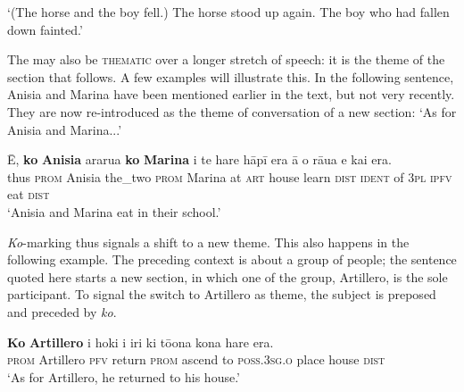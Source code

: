 \glt 
‘(The horse and the boy fell.) The horse stood up again. The boy who had fallen down fainted.’ \textstyleExampleref{[R399.025–026]}
\z

The  may also be \textsc{thematic} over a longer stretch of speech: it is the theme of the section that follows. A few examples will illustrate this. In the following sentence, Anisia and Marina have been mentioned earlier in the text, but not very recently. They are now re-introduced as the theme of conversation of a new section: ‘As for Anisia and Marina...’

\ea\label{ex:8.83}
\gll {\ꞌ}Ē, \textbf{ko} \textbf{Anisia} ararua \textbf{ko} \textbf{Marina} {\ꞌ}i te hare hāpī era {\ꞌ}ā o rāua  e kai era.\\
thus \textsc{prom} Anisia the\_two \textsc{prom} Marina at \textsc{art} house learn \textsc{dist} \textsc{ident} of \textsc{3pl}  \textsc{ipfv} eat \textsc{dist}\\

\glt
‘Anisia and Marina eat in their school.’ \textstyleExampleref{[R103.191]} 
\z

\textit{Ko}-marking thus signals a shift to a new theme. This also happens in the following example. The preceding context is about a group of people; the sentence quoted here starts a new section, in which one of the group, Artillero, is the sole participant. To signal the switch to Artillero as theme, the subject is preposed and preceded by \textit{ko}.

\ea\label{ex:8.84}
\gll \textbf{Ko} \textbf{Artillero} i hoki i iri ki tō{\ꞌ}ona kona hare era. \\
\textsc{prom} Artillero \textsc{pfv} return \textsc{prom} ascend to \textsc{poss.3sg.o} place house \textsc{dist} \\

\glt
‘As for Artillero, he returned to his house.’ \textstyleExampleref{[R437.055]} 
\z

